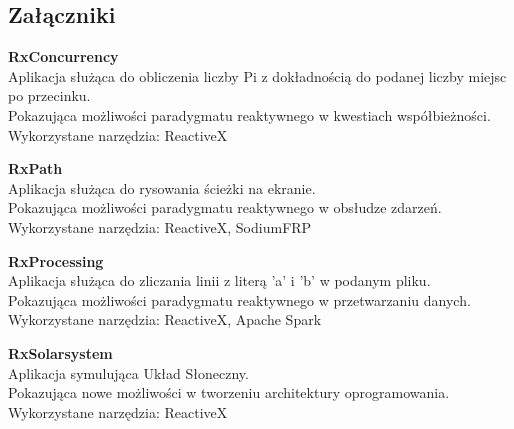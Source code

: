 \documentclass[a4paper,onecolumn,oneside,11pt,wide,floatssmall]{mwrep}
\theoremstyle{definition}
\theoremstyle{plain}%
\theoremstyle{remark}
\begin{document}
	
	 
	\begin{appendices}
		\chapter{Załączniki}
		\begin{description}
			\item \textbf{RxConcurrency} \\
			Aplikacja służąca do obliczenia liczby Pi z dokładnością do podanej liczby miejsc po przecinku. \\
			Pokazująca możliwości paradygmatu reaktywnego w kwestiach współbieżności. \\
			Wykorzystane narzędzia: ReactiveX
			\item \textbf{RxPath} \\
			Aplikacja służąca do rysowania ścieżki na ekranie. \\
			Pokazująca możliwości paradygmatu reaktywnego w obsłudze zdarzeń. \\
			Wykorzystane narzędzia: ReactiveX, SodiumFRP
			\item \textbf{RxProcessing}\\ 
			Aplikacja służąca do zliczania linii z literą 'a' i 'b' w podanym pliku.\\
			Pokazująca możliwości paradygmatu reaktywnego w przetwarzaniu danych. \\
			Wykorzystane narzędzia: ReactiveX, Apache Spark
			\item \textbf{RxSolarsystem} \\
			Aplikacja symulująca Układ Słoneczny. \\
			Pokazująca nowe możliwości w tworzeniu architektury oprogramowania.  \\
			Wykorzystane narzędzia: ReactiveX
		\end{description}
	\end{appendices}
\end{document}
